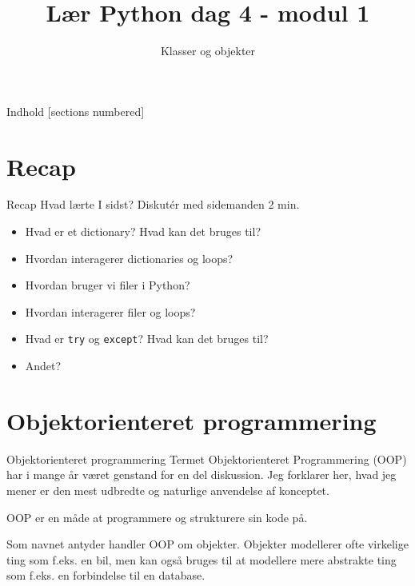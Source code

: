 \documentclass[main.tex]{subfiles}
\title{Lær Python dag 4 - modul 1}
\subtitle{Klasser og objekter}
\begin{document}
\maketitle

\begin{frame}{Indhold}
  [sections numbered]
  \tableofcontents[hideallsubsections]
\end{frame}


\section{Recap}


\begin{frame}{Recap}
Hvad lærte I sidst? Diskutér med sidemanden 2 min.

\begin{itemize}
	\item Hvad er et dictionary? Hvad kan det bruges til?
	\item Hvordan interagerer dictionaries og loops?
	\item Hvordan bruger vi filer i Python?
	\item Hvordan interagerer filer og loops?
	\item Hvad er \texttt{try} og \texttt{except}? Hvad kan det bruges til?
	\item Andet?
\end{itemize}

\end{frame}


\section{Objektorienteret programmering}

\begin{frame}{Objektorienteret programmering}
	Termet Objektorienteret Programmering (OOP) har i mange år været genstand for en del diskussion. Jeg forklarer her, hvad jeg mener er den mest udbredte og naturlige anvendelse af konceptet.

	\pause
	\medskip
	OOP er en måde at programmere og strukturere sin kode på.
	
	\pause
	\medskip
	
	Som navnet antyder handler OOP om objekter. Objekter modellerer ofte virkelige ting som f.eks. en bil, men kan også bruges til at modellere mere abstrakte ting som f.eks. en forbindelse til en database.

\end{frame}
\end{document}
